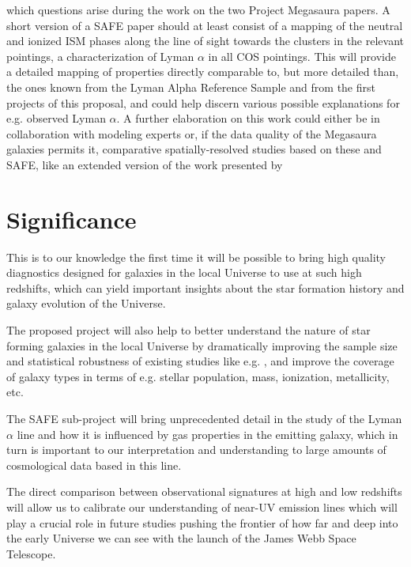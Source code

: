 \documentclass[12pt, a4paper]{scrartcl}
\begin{document}
		which questions arise during the work on the two Project 
		Megasaura papers. A short version of a SAFE paper should at
		least consist of a mapping of the neutral and ionized ISM phases
		along the line of sight towards the clusters in the relevant
		pointings, a characterization of Lyman $\alpha$ in all
		COS pointings. This will provide a detailed mapping of
		properties directly comparable to, but more detailed than, the 
		ones known from the Lyman Alpha Reference Sample and from the 
		first projects of this proposal, and could help discern various
		possible explanations for e.g. observed Lyman $\alpha$. 
		A further elaboration on this work could either be in
		collaboration with modeling experts  \citep{Schaerer2011,
			Laursen2009, Laursen2009b, Gronke2016, Verhamme2006, Verhamme2008}
		or, if the data quality of the Megasaura galaxies permits it,
		comparative spatially-resolved studies based on these and SAFE,
		like an extended version of the work presented by
		\cite{Bordoloi2016}


\section{Significance}

This is to our knowledge the first time it will be possible to bring high
quality diagnostics designed for galaxies in the local Universe to use at such
high redshifts, which can yield important insights about the star formation
history  and galaxy evolution of the Universe.

The proposed project will also help to better understand the nature of star
forming galaxies in the local Universe by dramatically improving the sample size
and statistical robustness of existing studies like e.g.
\cite{RiveraThorsen2015}, and improve the coverage of galaxy types in terms of
e.g. stellar population, mass, ionization, metallicity, etc.

The SAFE sub-project will bring unprecedented detail in the study of the Lyman
$\alpha$ line and how it is influenced by gas properties in the emitting galaxy,
which in turn is important to our interpretation and understanding to large
amounts of cosmological data based in this line.

The direct comparison between observational signatures at high and low redshifts
will allow us to calibrate our understanding of near-UV emission lines which
will play a crucial role in future studies pushing the frontier of how far and
deep into the early Universe we can see with the launch of the James Webb Space
Telescope.
\end{document}
